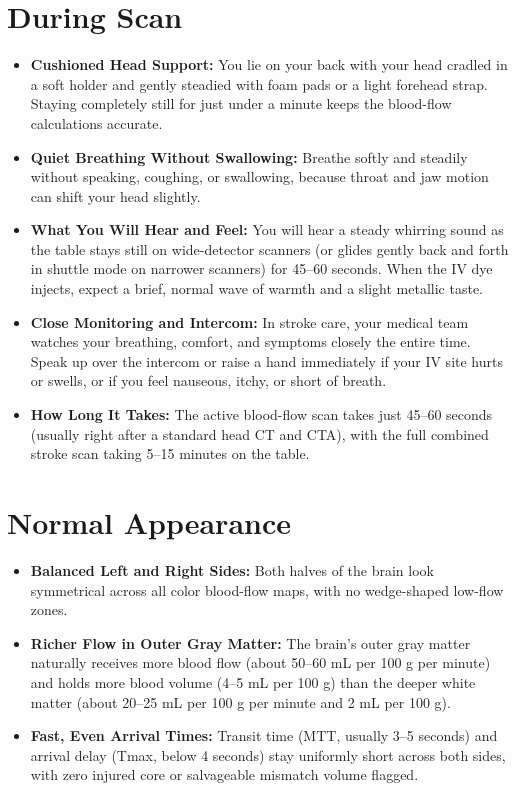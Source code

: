 \section{During Scan}
\begin{itemize}
    \item \textbf{Cushioned Head Support:} You lie on your back with your head cradled in a soft holder and gently steadied with foam pads or a light forehead strap. Staying completely still for just under a minute keeps the blood-flow calculations accurate.
    \item \textbf{Quiet Breathing Without Swallowing:} Breathe softly and steadily without speaking, coughing, or swallowing, because throat and jaw motion can shift your head slightly.
    \item \textbf{What You Will Hear and Feel:} You will hear a steady whirring sound as the table stays still on wide-detector scanners (or glides gently back and forth in shuttle mode on narrower scanners) for 45--60 seconds. When the IV dye injects, expect a brief, normal wave of warmth and a slight metallic taste.
    \item \textbf{Close Monitoring and Intercom:} In stroke care, your medical team watches your breathing, comfort, and symptoms closely the entire time. Speak up over the intercom or raise a hand immediately if your IV site hurts or swells, or if you feel nauseous, itchy, or short of breath.
    \item \textbf{How Long It Takes:} The active blood-flow scan takes just 45--60 seconds (usually right after a standard head CT and CTA), with the full combined stroke scan taking 5--15 minutes on the table.
\end{itemize}

\section{Normal Appearance}
\begin{itemize}
    \item \textbf{Balanced Left and Right Sides:} Both halves of the brain look symmetrical across all color blood-flow maps, with no wedge-shaped low-flow zones.
    \item \textbf{Richer Flow in Outer Gray Matter:} The brain's outer gray matter naturally receives more blood flow (about 50--60 mL per 100 g per minute) and holds more blood volume (4--5 mL per 100 g) than the deeper white matter (about 20--25 mL per 100 g per minute and 2 mL per 100 g).
    \item \textbf{Fast, Even Arrival Times:} Transit time (MTT, usually 3--5 seconds) and arrival delay (Tmax, below 4 seconds) stay uniformly short across both sides, with zero injured core or salvageable mismatch volume flagged.
\end{itemize}

